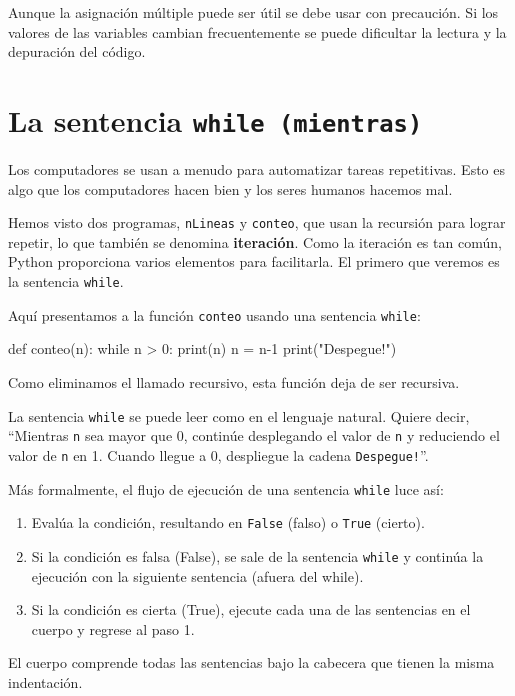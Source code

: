 Aunque la asignación múltiple puede ser útil se debe usar con precaución.
Si los valores de las variables cambian frecuentemente se puede dificultar
la lectura y la depuración del código.

\section{La sentencia \texttt{while (mientras)} }

  

Los computadores se usan a menudo para automatizar tareas repetitivas.
Esto es algo que los computadores hacen bien y los seres humanos hacemos
mal.

Hemos visto dos programas, \texttt{nLineas} y \texttt{conteo}, que
usan la recursión para lograr repetir, lo que también se denomina
\textbf{iteración}. Como la iteración es tan común, Python proporciona
varios elementos para facilitarla. El primero que veremos es la sentencia
\texttt{while}.

Aquí presentamos a la función \texttt{conteo} usando una sentencia
\texttt{while}:

\begin{pythoncode}
def conteo(n):
  while n > 0:
    print(n)
    n = n-1
  print("Despegue!")
\end{pythoncode}
 Como eliminamos el llamado recursivo, esta función deja de ser recursiva.

La sentencia \texttt{while} se puede leer como en el lenguaje natural.
Quiere decir, ``Mientras \texttt{n} sea mayor que 0, continúe desplegando
el valor de \texttt{n} y reduciendo el valor de \texttt{n} en 1. Cuando
llegue a 0, despliegue la cadena \texttt{Despegue!}''.

Más formalmente, el flujo de ejecución de una sentencia \texttt{while}
luce así:
\begin{enumerate}
\item Evalúa la condición, resultando en \texttt{False} (falso) o \texttt{True}
(cierto).
\item Si la condición es falsa (False), se sale de la sentencia \texttt{while}
y continúa la ejecución con la siguiente sentencia (afuera del while).
\item Si la condición es cierta (True), ejecute cada una de las sentencias
en el cuerpo y regrese al paso 1.
\end{enumerate}
El cuerpo comprende todas las sentencias bajo la cabecera que tienen
la misma indentación.

